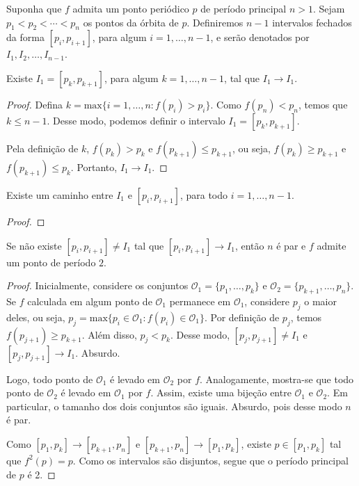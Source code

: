 Suponha que $f$ admita um ponto periódico $p$ de período principal $n > 1$. Sejam $p_1 < p_2 < \cdots < p_n$ os pontos da órbita de $p$. Definiremos $n-1$ intervalos fechados da forma $[p_i, p_{i+1}]$, para algum $i = 1, \dots, n-1$, e serão denotados por $I_1, I_2, \dots, I_{n-1}$.

\begin{lemma}
Existe $I_1 = [p_k, p_{k+1}]$, para algum $k = 1, \dots, n-1$, tal que $I_1 \longrightarrow I_1$.
\end{lemma}

\begin{proof}
Defina $k = \textrm{max}\{i = 1, \dots, n : f(p_i) > p_i\}$. Como $f(p_{n}) < p_n$, temos que $k \leq n-1$. Desse modo, podemos definir o intervalo $I_1 = [p_k, p_{k+1}]$.

Pela definição de $k$, $f(p_k) > p_k$ e $f(p_{k+1}) \leq p_{k+1}$, ou seja, $f(p_k) \geq p_{k+1}$ e $f(p_{k+1}) \leq p_k$. Portanto, $I_1 \longrightarrow I_1$.
\end{proof}

\begin{lemma}
Existe um caminho entre $I_1$ e $[p_i, p_{i+1}]$, para todo $i = 1, \dots, n-1$.
\end{lemma}

\begin{proof}
\end{proof}

\begin{lemma}
Se não existe $[p_i, p_{i+1}]  \neq I_1$  tal que $[p_i, p_{i+1}] \longrightarrow I_1$, então $n$ é par e $f$ admite um ponto de período $2$.
\end{lemma}

\begin{proof}
Inicialmente, considere os conjuntos $\mathcal{O}_1 = \{p_1, \dots, p_k\}$ e $\mathcal{O}_2 = \{p_{k+1}, \dots, p_n\}$. Se $f$ calculada em algum ponto de $\mathcal{O}_1$ permanece em $\mathcal{O}_1$, considere $p_j$ o maior deles, ou seja, $p_j = \textrm{max}\{p_i \in \mathcal{O}_1 : f(p_i) \in \mathcal{O}_1\}$. Por definição de $p_j$, temos $f(p_{j+1}) \geq p_{k+1}$. Além disso, $p_j < p_k$. Desse modo, $[p_j, p_{j+1}] \neq I_1$ e $[p_j, p_{j+1}] \longrightarrow I_1$. Absurdo.

Logo, todo ponto de $\mathcal{O}_1$ é levado em $\mathcal{O}_2$ por $f$. Analogamente, mostra-se que todo ponto de $\mathcal{O}_2$ é levado em $\mathcal{O}_1$ por $f$. Assim, existe uma bijeção entre $\mathcal{O}_1$ e $\mathcal{O}_2$. Em particular, o tamanho dos dois conjuntos  são iguais. Absurdo, pois desse modo $n$ é par.

Como $[p_1, p_k] \longrightarrow [p_{k+1}, p_n]$ e $[p_{k+1}, p_n] \longrightarrow [p_1, p_k]$, existe $p \in [p_1, p_k]$ tal que $f^2(p) = p$. Como os intervalos são disjuntos, segue que o período principal de $p$ é 2.
\end{proof}

